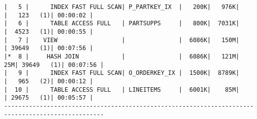 \documentclass[11pt,a4paper,parskip=half]{scrartcl}
\begin{document}
\begin{lstlisting}
|   5 |      INDEX FAST FULL SCAN| P_PARTKEY_IX  |   200K|   976K|       |   123   (1)| 00:00:02 |                                                                                                                                                                                                           
|   6 |      TABLE ACCESS FULL   | PARTSUPPS     |   800K|  7031K|       |  4523   (1)| 00:00:55 |                                                                                                                                                                                                           
|   7 |    VIEW                  |               |  6086K|   150M|       | 39649   (1)| 00:07:56 |                                                                                                                                                                                                           
|*  8 |     HASH JOIN            |               |  6086K|   121M|    25M| 39649   (1)| 00:07:56 |                                                                                                                                                                                                           
|   9 |      INDEX FAST FULL SCAN| O_ORDERKEY_IX |  1500K|  8789K|       |   965   (2)| 00:00:12 |                                                                                                                                                                                                           
|  10 |      TABLE ACCESS FULL   | LINEITEMS     |  6001K|    85M|       | 29675   (1)| 00:05:57 |                                                                                                                                                                                                           
--------------------------------------------------------------------------------------------------                                                                                                                                                                                                           
                                                                                                                                                                                                                                                                                                             

\end{lstlisting}
\end{document}
